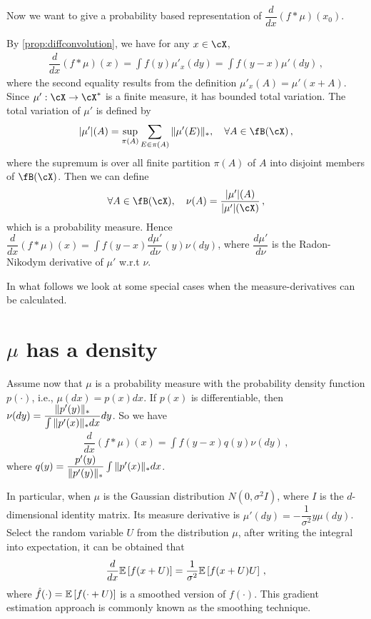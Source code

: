 \documentclass[11pt,letterpaper,english]{article}
\newcommand{\Borel}{\fB}
\begin{document}
Now we want to give a probability based representation of $\dfrac{d}{dx} (f*\mu) (x_0)$.

By \cref{prop:diffconvolution}, we have for any $x\in \cX$,
\begin{align*}
\dfrac{d}{dx} (f*\mu) (x) = \int f(y)\mu'_{x}(dy)
= \int f(y-x)\mu'(dy) \,,
\end{align*}
where the second equality results from the definition $\mu'_{x}(A)=\mu'(x+A)$. 
Since $\mu':\cX\to \cX^*$ is a finite measure, it has bounded total variation. The total variation of $\mu'$ is defined by
\begin{align*}
\vert \mu' \vert (A) = \sup_{\pi(A)} \sum_{E\in \pi(A)} \norm{\mu'(E)}_*, \quad \forall A \in \Borel(\cX) \,,
\end{align*}
where the supremum is over all finite partition $\pi(A)$ of $A$ into disjoint members of $\Borel(\cX)$.
Then we can define 
\begin{align*}
\forall A \in \Borel(\cX), \quad
\nu(A) = \dfrac{\vert \mu' \vert (A)}{\vert \mu' \vert (\cX)}\,,
\end{align*}
which is a probability measure. Hence 
$\dfrac{d}{dx} (f*\mu) (x) =  \int f(y-x) \dfrac{d\mu'}{d\nu}(y) \nu(dy)$, where $\dfrac{d\mu'}{d\nu}$ is the Radon-Nikodym derivative of $\mu'$ w.r.t $\nu$.

In what follows we look at some special cases when the measure-derivatives can be calculated.
\section{$\mu$ has a density}
Assume now that $\mu$ is a probability measure with the probability density function $p(\cdot)$, i.e., $\mu(dx) = p(x)dx$. If $p(x)$ is differentiable, then
$\nu(dy) = \dfrac{\|p'(y)\|_*}{\int \|p'(x)\|_*dx}dy$.
So we have
\begin{align*}
\dfrac{d}{dx} (f*\mu) (x) =  \int f(y-x) q(y) \nu (dy)\,,
\end{align*}
where $q(y) = \dfrac{p'(y)}{\|p'(y)\|_*}\int \|p'(x)\|_*dx$.

In particular, when $\mu$ is the Gaussian distribution $N(0, \sigma^2 I)$, where $I$ is the $d$-dimensional identity matrix.  Its measure derivative is
$\mu'(dy) = -\dfrac{1}{\sigma^2}y\mu(dy)$.
Select the random variable $U$ from the distribution $\mu$, 
after writing the integral into expectation, it can be obtained that 
\begin{align*}
\dfrac{d}{dx} \mathbb{E}\left[f(x+U)\right] = \dfrac{1}{\sigma^2}\mathbb{E}\left[f(x+U)U\right] \,,
\end{align*}
where $\hat{f}(\cdot)=\mathbb{E}\left[f(\cdot+U)\right]$ is a smoothed version of $f(\cdot)$. This gradient estimation approach is commonly known as the smoothing technique.
\end{document}

